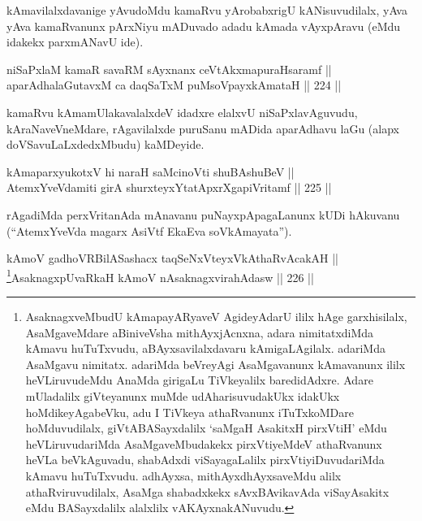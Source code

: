 \begin{artha}
kAmavilalxdavanige yAvudoMdu kamaRvu yArobabxrigU kANisuvudilalx, yAva
yAva kamaRvanunx pArxNiyu mADuvado adadu kAmada vAyxpAravu (eMdu
idakekx parxmANavU ide).
\end{artha}

\begin{shl}
niSaPxlaM kamaR savaRM sAyxnanx ceVtAkxmapuraHsaramf || \\
aparAdhalaGutavxM ca daqSaTxM puMsoV\s payxkAmataH \hfill || 224 ||  
\end{shl}

\begin{artha}
kamaRvu kAma\s mUlakavalalxdeV idadxre elalxvU niSaPxlavAguvudu,
kAraNaveVneMdare, rAgavilalxde puruSanu mADida aparAdhavu laGu (alapx
doVSavuLaLxdedxMbudu) kaMDeyide.
\end{artha}

\begin{shl}
kAmaparxyukotxV hi naraH saMcinoVti shuBAshuBeV || \\
AtemxYveVdamiti girA shurxteyxYtatApxrXgapiVritamf \hfill || 225 ||  
\end{shl}

\begin{artha}
rAgadiMda perxVritanAda mAnavanu puNayxpApagaLanunx kUDi hAkuvanu (``AtemxYveVda magarx AsiVtf EkaEva soV\s kAmayata'').
\end{artha}


\begin{shl}
kAmoV gadhoVR\s BilASashacx taqSeNxVteyxVkAthaRvAcakAH || \\
\footnote{AsaknagxveMbudU kAmapayARyaveV AgideyAdarU ililx hAge garxhisilalx,
AsaMgaveMdare aBiniveVsha mithAyxjAcnxna, adara nimitatxdiMda kAmavu
huTuTxvudu, aBAyxsavilalxdavaru kAmigaLAgilalx. adariMda AsaMgavu
nimitatx. adariMda beVreyAgi AsaMgavanunx kAmavanunx ililx
heVLiruvudeMdu AnaMda girigaLu TiVkeyalilx baredidAdxre. Adare
mUladalilx giVteyanunx muMde udAharisuvudakUkx idakUkx
hoMdikeyAgabeVku, adu I TiVkeya athaRvanunx iTuTxkoMDare
hoMduvudilalx, giVtABASayxdalilx `saMgaH AsakitxH pirxVtiH' eMdu
heVLiruvudariMda AsaMgaveMbudakekx pirxVtiyeMdeV athaRvanunx heVLa
beVkAguvadu, shabAdxdi viSayagaLalilx  pirxVtiyiDuvudariMda kAmavu
huTuTxvudu. adhAyxsa, mithAyxdhAyxsaveMdu alilx athaRviruvudilalx,
AsaMga shabadxkekx sAvxBAvikavAda viSayAsakitx eMdu BASayxdalilx
alalxlilx vAKAyxnakANuvudu.}AsaknagxpUvaRkaH kAmoV nA\s \s saknagxvirahAdasw \hfill || 226 ||  
\end{shl}


